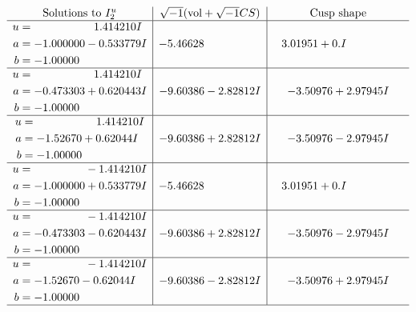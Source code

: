 \documentclass[1p]{elsarticle_modified}
\theoremstyle{definition}
\newcommand{\I}{\sqrt{-1}}
\begin{document}
$$\begin{array}{c|c|c}  
\text{Solutions to }I^u_{2}& \I (\text{vol} + \sqrt{-1}CS) & \text{Cusp shape}\\
 \hline 
\begin{aligned}
u &= \phantom{-0.000000 -}1.414210 I \\
a &= -1.000000 - 0.533779 I \\
b &= -1.00000\phantom{ +0.000000I}\end{aligned}
 & -5.46628\phantom{ +0.000000I} & \phantom{-}3.01951 + 0. I\phantom{ +0.000000I} \\ \hline\begin{aligned}
u &= \phantom{-0.000000 -}1.414210 I \\
a &= -0.473303 + 0.620443 I \\
b &= -1.00000\phantom{ +0.000000I}\end{aligned}
 & -9.60386 - 2.82812 I & -3.50976 + 2.97945 I \\ \hline\begin{aligned}
u &= \phantom{-0.000000 -}1.414210 I \\
a &= -1.52670 + 0.62044 I \\
b &= -1.00000\phantom{ +0.000000I}\end{aligned}
 & -9.60386 + 2.82812 I & -3.50976 - 2.97945 I \\ \hline\begin{aligned}
u &= \phantom{-0.000000 } -1.414210 I \\
a &= -1.000000 + 0.533779 I \\
b &= -1.00000\phantom{ +0.000000I}\end{aligned}
 & -5.46628\phantom{ +0.000000I} & \phantom{-}3.01951 + 0. I\phantom{ +0.000000I} \\ \hline\begin{aligned}
u &= \phantom{-0.000000 } -1.414210 I \\
a &= -0.473303 - 0.620443 I \\
b &= -1.00000\phantom{ +0.000000I}\end{aligned}
 & -9.60386 + 2.82812 I & -3.50976 - 2.97945 I \\ \hline\begin{aligned}
u &= \phantom{-0.000000 } -1.414210 I \\
a &= -1.52670 - 0.62044 I \\
b &= -1.00000\phantom{ +0.000000I}\end{aligned}
 & -9.60386 - 2.82812 I & -3.50976 + 2.97945 I\\
 \hline 
 \end{array}$$\newpage\newpage\renewcommand{\arraystretch}{1}
\end{document}
